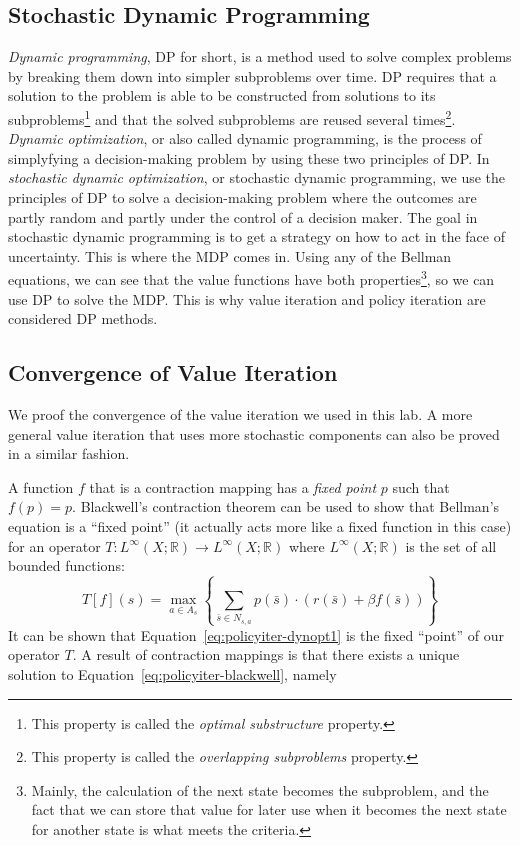 \subsection*{Stochastic Dynamic Programming}
\emph{Dynamic programming}, DP for short, is a method used to solve complex problems by breaking them down into simpler subproblems over time.
DP requires that a solution to the problem is able to be constructed from solutions to its subproblems\footnote{This property is called the \emph{optimal substructure} property.} and that the solved subproblems are reused several times\footnote{This property is called the \emph{overlapping subproblems} property.}.
\emph{Dynamic optimization}, or also called dynamic programming, is the process of simplyfying a decision-making problem by using these two principles of DP.
In \emph{stochastic dynamic optimization}, or stochastic dynamic programming, we use the principles of DP to solve a decision-making problem where the outcomes are partly random and partly under the control of a decision maker.
The goal in stochastic dynamic programming is to get a strategy on how to act in the face of uncertainty.
This is where the MDP comes in.
Using any of the Bellman equations, we can see that the value functions have both properties\footnote{Mainly, the calculation of the next state becomes the subproblem, and the fact that we can store that value for later use when it becomes the next state for another state is what meets the criteria.}, so we can use DP to solve the MDP.
This is why value iteration and policy iteration are considered DP methods.

\subsection*{Convergence of Value Iteration}
We proof the convergence of the value iteration we used in this lab.
A more general value iteration that uses more stochastic components can also be proved in a similar fashion.

A function $f$ that is a contraction mapping has a \emph{fixed point} $p$ such that $f(p) = p$.
Blackwell's contraction theorem can be used to show that Bellman's equation is a ``fixed point'' (it actually acts more like a fixed function in this case)
for an operator $T: L^{\infty}(X;\mathbb{R}) \to L^{\infty}(X;\mathbb{R})$ where $L^{\infty}(X;\mathbb{R})$ is the set of all bounded functions:
\begin{equation}
\label{eq:policyiter-blackwell}
T[f](s) = \max_{a \in A_s} \left\{\sum_{\bar{s}\in N_{s,a}} p(\bar{s}) \cdot \left( r(\bar{s}) + \beta f(\bar{s})\right)\right\}
\end{equation}
It can be shown that Equation\ \ref{eq:policyiter-dynopt1} is the fixed ``point'' of our operator $T$.
A result of contraction mappings is that there exists a unique solution to Equation\ \ref{eq:policyiter-blackwell}, namely

